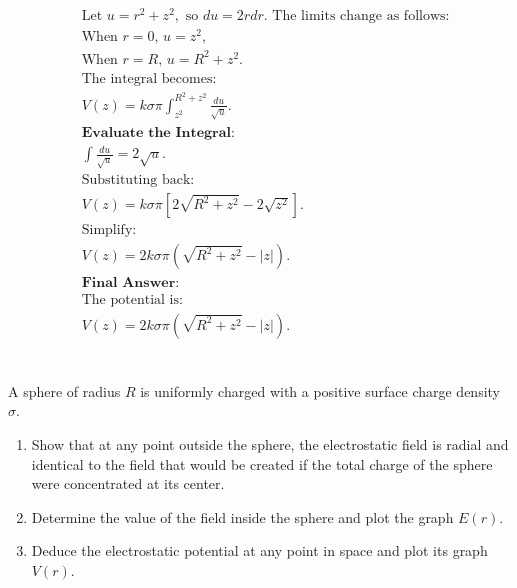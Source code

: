 \documentclass[12pt]{article}
\begin{document}
\begin{correctionbox}
\begin{align*}
		 & \text{Let } u = r^2 + z^2, \text{ so } du = 2r dr. \text{ The limits change as follows:}                \\
		 & \text{When } r = 0, \, u = z^2,                                                                         \\
		 & \text{When } r = R, \, u = R^2 + z^2.
		\\
		 & \text{The integral becomes:}                                                                            \\
		 & V(z) = k \sigma \pi \int_{z^2}^{R^2 + z^2} \frac{du}{\sqrt{u}}.
		\\
		 & \textbf{Evaluate the Integral:}                                                                         \\
		 & \int \frac{du}{\sqrt{u}} = 2 \sqrt{u}.
		\\
		 & \text{Substituting back:}                                                                               \\
		 & V(z) = k \sigma \pi \left[ 2 \sqrt{R^2 + z^2} - 2 \sqrt{z^2} \right].
		\\
		 & \text{Simplify:}                                                                                        \\
		 & V(z) = 2 k \sigma \pi \left( \sqrt{R^2 + z^2} - |z| \right).
		\\
		 & \textbf{Final Answer:}                                                                                  \\
		 & \text{The potential is:}                                                                                \\
		 & V(z) = 2 k \sigma \pi \left( \sqrt{R^2 + z^2} - |z| \right).
	\end{align*}
\end{correctionbox}

\section{}
A sphere of radius $ R $ is uniformly charged with a positive surface charge density $ \sigma $.
\begin{enumerate}
	\item Show that at any point outside the sphere, the electrostatic field is radial and identical to the field that would be created if the total charge of the sphere were concentrated at its center.
	\item Determine the value of the field inside the sphere and plot the graph $ E(r) $.
	\item Deduce the electrostatic potential at any point in space and plot its graph $ V(r) $.
\end{enumerate}
\end{document}
